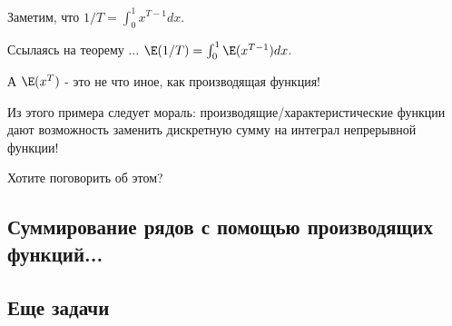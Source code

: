 {Заметим, что $1/T=\int_{0}^{1}x^{T-1}dx$.

Ссылаясь на теорему ... $\E(1/T)=\int_{0}^{1}\E(x^{T-1})dx$.

А $\E(x^{T})$ - это не что иное, как производящая функция!



Из этого примера следует мораль: производящие/характеристические функции дают возможность заменить дискретную сумму на интеграл непрерывной функции!

Хотите поговорить об этом?

}\subsection{Суммирование рядов с помощью производящих функций...} \subsection{Еще задачи}

